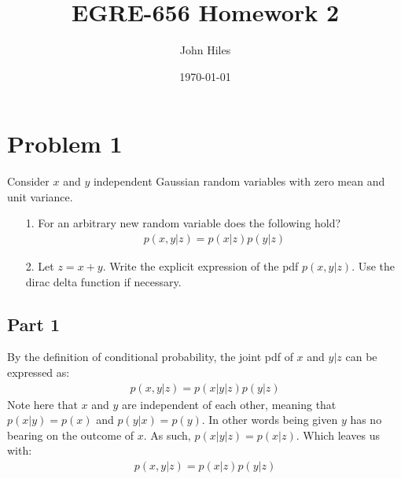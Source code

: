 \documentclass{article}
\title{EGRE-656 Homework 2}
\author{John Hiles}
\date\today
\begin{document}
\maketitle %


\section*{Problem 1}
Consider $x$ and $y$ independent Gaussian random variables with zero mean and unit variance.
\begin{enumerate}
\item[1.] For an arbitrary new random variable does the following hold?
\begin{align*}
p(x,y|z) = p(x|z)p(y|z)
\end{align*}
\item[2.] Let $z=x+y$. Write the explicit expression of the pdf $p(x,y|z)$. Use the dirac delta function if necessary.
\end{enumerate}
\subsection*{Part 1}
By the definition of conditional probability, the joint pdf of $x$ and $y|z$ can be expressed as:
\begin{align*}
p(x,y|z) = p(x|y|z)p(y|z)
\end{align*}
Note here that $x$ and $y$ are independent of each other, meaning that $p(x|y)=p(x)$ and $p(y|x)=p(y)$. In other words being given $y$ has no bearing on the outcome of $x$. As such, $p(x|y|z)=p(x|z)$. Which leaves us with:
\begin{align*}
\boxed{ p(x,y|z) = p(x|z)p(y|z) }
\end{align*}
\end{document}
